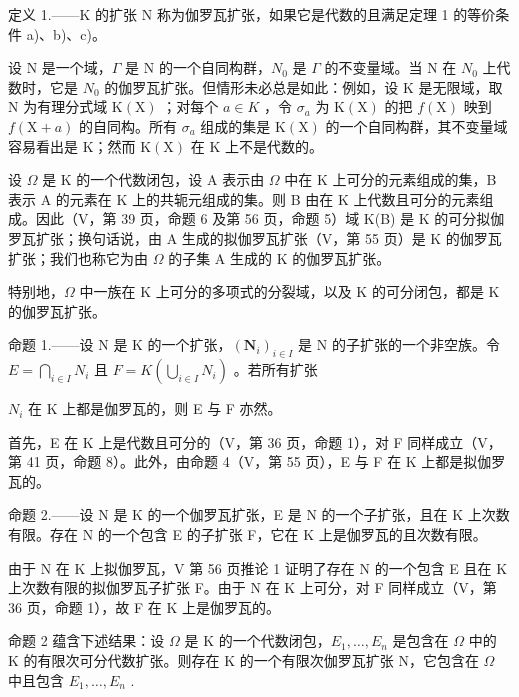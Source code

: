 定义 1.——K 的扩张 N 称为伽罗瓦扩张，如果它是代数的且满足定理 1 的等价条件 a)、b)、c)。

设 N 是一个域，\(\Gamma\) 是 N 的一个自同构群，\(N_{0}\) 是 \(\Gamma\) 的不变量域。当 N 在 \(N_{0}\) 上代数时，它是 \(N_{0}\) 的伽罗瓦扩张。但情形未必总是如此：例如，设 K 是无限域，取 N 为有理分式域 \(\mathrm{K}(\mathrm{X})\) ；对每个 \(a \in K\) ，令 \(\sigma_{a}\) 为 \(\mathrm{K}(\mathrm{X})\) 的把 \(f(\mathrm{X})\) 映到 \(f(\mathrm{X} + a)\) 的自同构。所有 \(\sigma_{a}\) 组成的集是 \(\mathrm{K}(\mathrm{X})\) 的一个自同构群，其不变量域容易看出是 K；然而 \(\mathrm{K}(\mathrm{X})\) 在 K 上不是代数的。

设 \(\Omega\) 是 K 的一个代数闭包，设 A 表示由 \(\Omega\) 中在 K 上可分的元素组成的集，B 表示 A 的元素在 K 上的共轭元组成的集。则 B 由在 K 上代数且可分的元素组成。因此（V，第 39 页，命题 6 及第 56 页，命题 5）域 K(B) 是 K 的可分拟伽罗瓦扩张；换句话说，由 A 生成的拟伽罗瓦扩张（V，第 55 页）是 K 的伽罗瓦扩张；我们也称它为由 \(\Omega\) 的子集 A 生成的 K 的伽罗瓦扩张。

特别地，\(\Omega\) 中一族在 K 上可分的多项式的分裂域，以及 K 的可分闭包，都是 K 的伽罗瓦扩张。

命题 1.——设 N 是 K 的一个扩张，\((\mathbf{N}_{i})_{i\in I}\) 是 N 的子扩张的一个非空族。令 \(E=\bigcap_{i\in I}N_{i}\) 且 \(F=K\left(\bigcup_{i\in I}N_{i}\right)\) 。若所有扩张

\(N_{i}\) 在 K 上都是伽罗瓦的，则 E 与 F 亦然。

首先，E 在 K 上是代数且可分的（V，第 36 页，命题 1），对 F 同样成立（V，第 41 页，命题 8）。此外，由命题 4（V，第 55 页），E 与 F 在 K 上都是拟伽罗瓦的。

命题 2.——设 N 是 K 的一个伽罗瓦扩张，E 是 N 的一个子扩张，且在 K 上次数有限。存在 N 的一个包含 E 的子扩张 F，它在 K 上是伽罗瓦的且次数有限。

由于 N 在 K 上拟伽罗瓦，V 第 56 页推论 1 证明了存在 N 的一个包含 E 且在 K 上次数有限的拟伽罗瓦子扩张 F。由于 N 在 K 上可分，对 F 同样成立（V，第 36 页，命题 1），故 F 在 K 上是伽罗瓦的。

命题 2 蕴含下述结果：设 \(\Omega\) 是 K 的一个代数闭包，\(E_1, \ldots, E_n\) 是包含在 \(\Omega\) 中的 K 的有限次可分代数扩张。则存在 K 的一个有限次伽罗瓦扩张 N，它包含在 \(\Omega\) 中且包含 \(E_1, \ldots, E_n\) .

